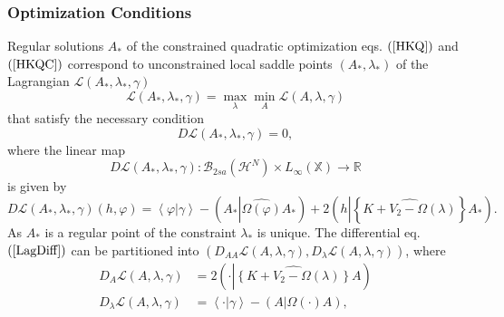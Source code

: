 \documentclass[aps,preprint]{revtex4}%
\begin{document}
\subsubsection{Optimization Conditions}

Regular solutions $A_{\ast}$ of the constrained quadratic optimization eqs.
$\left(  \ref{HKQ}\right)  $ and $\left(  \ref{HKQC}\right)  $ correspond to
unconstrained local saddle points $\left(  A_{\ast},\lambda_{\ast}\right)  $
\cite{KKT} of the Lagrangian $\mathcal{L}\left(  A_{\ast},\lambda_{\ast
},\gamma\right)  $
\begin{equation}
\mathcal{L}\left(  A_{\ast},\lambda_{\ast},\gamma\right)  =\max_{\lambda}%
\min_{A}\mathcal{L}\left(  A,\lambda,\gamma\right)
\end{equation}
that satisfy the necessary condition
\begin{equation}
D\mathcal{L}\left(  A_{\ast},\lambda_{\ast},\gamma\right)  =0,
\end{equation}
where the linear map
\begin{equation}
D\mathcal{L}\left(  A_{\ast},\lambda_{\ast},\gamma\right)  :\mathcal{B}%
_{2sa}\left(  \mathcal{H}^{N}\right)  \times L_{\infty}\left(  \mathbb{X}%
\right)  \rightarrow\mathbb{R}%
\end{equation}
is given by%
\begin{equation}
D\mathcal{L}\left(  A_{\ast},\lambda_{\ast},\gamma\right)  \left(
h,\varphi\right)  =\left\langle \varphi\left\vert \gamma\right.  \right\rangle
-\left(  A_{\ast}\left\vert \widehat{\Omega\left(  \varphi\right)  }\right.
A_{\ast}\right)  +2\left(  h\left\vert \left\{  \widehat{K+V_{2}-\Omega\left(
\lambda\right)  }\right\}  \right.  A_{\ast}\right)  . \label{LagDiff}%
\end{equation}
As $A_{\ast}$ is a regular point of the constraint $\lambda_{\ast}$ is unique.
The differential eq. $\left(  \ref{LagDiff}\right)  $ can be partitioned into
$\left(  D_{AA}\mathcal{L}\left(  A,\lambda,\gamma\right)  ,D_{\lambda
}\mathcal{L}\left(  A,\lambda,\gamma\right)  \right)  $, where
\begin{align}
D_{A}\mathcal{L}\left(  A,\lambda,\gamma\right)   &  =2\left(  \cdot\left\vert
\widehat{\left\{  K+V_{2}-\Omega\left(  \lambda\right)  \right\}  }\right.
A\right) \nonumber\\
D_{\lambda}\mathcal{L}\left(  A,\lambda,\gamma\right)   &  =\left\langle
\cdot\left\vert \gamma\right.  \right\rangle -\left(  A\left\vert
\Omega\left(  \cdot\right)  \right.  A\right)  ,
\end{align}
\end{document}
